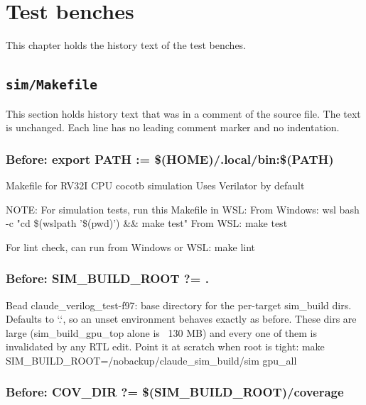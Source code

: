 \chapter{Test benches}\label{cr:ch:test-benches}

This chapter holds the history text of the test benches.

\section{\texttt{sim/Makefile}}\label{cr:suite:sim-makefile}

This section holds history text that was in a comment of the source file. The text is unchanged. Each line has no leading comment marker and no indentation.

\begin{record}

\subsection*{Before: export PATH := \$(HOME)/.local/bin:\$(PATH)}

\begin{textblock}
Makefile for RV32I CPU cocotb simulation
Uses Verilator by default

NOTE: For simulation tests, run this Makefile in WSL:
  From Windows: wsl bash -c "cd \$(wslpath '\$(pwd)') && make test"
  From WSL: make test

For lint check, can run from Windows or WSL:
  make lint
\end{textblock}

\subsection*{Before: SIM\_BUILD\_ROOT ?= .}

\begin{textblock}
Bead claude_verilog_test-f97: base directory for the per-target sim_build dirs.
Defaults to `.`, so an unset environment behaves exactly as before.  These dirs
are large (sim_build_gpu_top alone is ~130 MB) and every one of them is
invalidated by any RTL edit.  Point it at scratch when root is tight:
  make SIM_BUILD_ROOT=/nobackup/claude_sim_build/sim gpu_all
\end{textblock}

\subsection*{Before: COV\_DIR ?= \$(SIM\_BUILD\_ROOT)/coverage}


\end{record}
